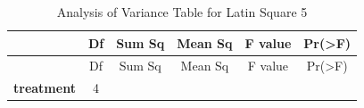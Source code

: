 \documentclass[]{article}
\begin{document}
\begin{longtable}[]{@{}cccccc@{}}
\caption{Analysis of Variance Table for Latin Square 5}\tabularnewline
\toprule
\begin{minipage}[b]{0.19\columnwidth}\centering\strut
~\strut
\end{minipage} & \begin{minipage}[b]{0.06\columnwidth}\centering\strut
Df\strut
\end{minipage} & \begin{minipage}[b]{0.10\columnwidth}\centering\strut
Sum Sq\strut
\end{minipage} & \begin{minipage}[b]{0.12\columnwidth}\centering\strut
Mean Sq\strut
\end{minipage} & \begin{minipage}[b]{0.12\columnwidth}\centering\strut
F value\strut
\end{minipage} & \begin{minipage}[b]{0.12\columnwidth}\centering\strut
Pr(\textgreater{}F)\strut
\end{minipage}\tabularnewline
\midrule
\endfirsthead
\toprule
\begin{minipage}[b]{0.19\columnwidth}\centering\strut
~\strut
\end{minipage} & \begin{minipage}[b]{0.06\columnwidth}\centering\strut
Df\strut
\end{minipage} & \begin{minipage}[b]{0.10\columnwidth}\centering\strut
Sum Sq\strut
\end{minipage} & \begin{minipage}[b]{0.12\columnwidth}\centering\strut
Mean Sq\strut
\end{minipage} & \begin{minipage}[b]{0.12\columnwidth}\centering\strut
F value\strut
\end{minipage} & \begin{minipage}[b]{0.12\columnwidth}\centering\strut
Pr(\textgreater{}F)\strut
\end{minipage}\tabularnewline
\midrule
\endhead
\begin{minipage}[t]{0.19\columnwidth}\centering\strut
\textbf{treatment}\strut
\end{minipage} & \begin{minipage}[t]{0.06\columnwidth}\centering\strut
4\strut
\end{minipage} & \begin{minipage}[t]{0.10\columnwidth}\centering\strut

\end{minipage}
\end{longtable}
\end{document}

